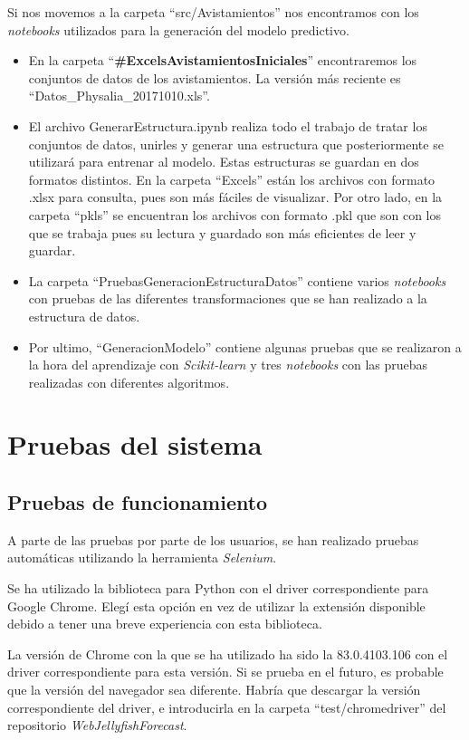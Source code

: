 Si nos movemos a la carpeta ``src/Avistamientos'' nos encontramos con los \emph{notebooks} utilizados para la generación del modelo predictivo.
\begin{itemize}
	\item En la carpeta ``\textbf{\#ExcelsAvistamientosIniciales}'' encontraremos los conjuntos de datos de los avistamientos. La versión más reciente es ``Datos\_Physalia\_20171010.xls''.
	\item El archivo GenerarEstructura.ipynb realiza todo el trabajo de tratar los conjuntos de datos, unirles y generar una estructura que posteriormente se utilizará para entrenar al modelo. Estas estructuras se guardan en dos formatos distintos. En la carpeta ``Excels'' están los archivos con formato .xlsx para consulta, pues son más fáciles de visualizar. Por otro lado, en la carpeta ``pkls'' se encuentran los archivos con formato .pkl que son con los que se trabaja pues su lectura y guardado son más eficientes de leer y guardar.
	\item La carpeta ``PruebasGeneracionEstructuraDatos'' contiene varios \emph{notebooks} con pruebas de las diferentes transformaciones que se han realizado a la estructura de datos. 
	\item Por ultimo, ``GeneracionModelo'' contiene algunas pruebas que se realizaron a la hora del aprendizaje con \emph{Scikit-learn} y tres \emph{notebooks} con las  pruebas realizadas con diferentes algoritmos.
\end{itemize}

\section{Pruebas del sistema}

\subsection{Pruebas de funcionamiento}
A parte de las pruebas por parte de los usuarios, se han realizado pruebas automáticas utilizando la herramienta \emph{Selenium}.

Se ha utilizado la biblioteca para Python con el driver correspondiente para Google Chrome. Elegí esta opción en vez de utilizar la extensión disponible debido a tener una breve experiencia con esta biblioteca. 

La versión de Chrome con la que se ha utilizado ha sido la 83.0.4103.106 con el driver correspondiente para esta versión. Si se prueba en el futuro, es probable que la versión del navegador sea diferente. Habría que descargar la versión correspondiente del driver, e introducirla en la carpeta ``test/chromedriver'' del repositorio \emph{WebJellyfishForecast}.

